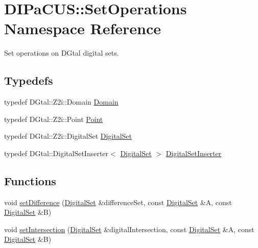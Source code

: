\hypertarget{namespaceDIPaCUS_1_1SetOperations}{}\section{D\+I\+Pa\+C\+US\+:\+:Set\+Operations Namespace Reference}
\label{namespaceDIPaCUS_1_1SetOperations}


Set operations on D\+Gtal digital sets.  


\subsection*{Typedefs}
\begin{DoxyCompactItemize}
\item 
typedef D\+Gtal\+::\+Z2i\+::\+Domain \hyperlink{namespaceDIPaCUS_1_1SetOperations_adf150e3c3201e8eb8b65d3d03b63df69}{Domain}
\item 
typedef D\+Gtal\+::\+Z2i\+::\+Point \hyperlink{namespaceDIPaCUS_1_1SetOperations_aef7c8778c0d7fe3bb3d34608fdef58cc}{Point}
\item 
typedef D\+Gtal\+::\+Z2i\+::\+Digital\+Set \hyperlink{namespaceDIPaCUS_1_1SetOperations_a66926bf2c0a8f9e0192373c76f1b75e1}{Digital\+Set}
\item 
typedef D\+Gtal\+::\+Digital\+Set\+Inserter$<$ \hyperlink{namespaceDIPaCUS_1_1SetOperations_a66926bf2c0a8f9e0192373c76f1b75e1}{Digital\+Set} $>$ \hyperlink{namespaceDIPaCUS_1_1SetOperations_a543100a4da6a06c13ee32ad5886d7031}{Digital\+Set\+Inserter}
\end{DoxyCompactItemize}
\subsection*{Functions}
\begin{DoxyCompactItemize}
\item 
void \hyperlink{namespaceDIPaCUS_1_1SetOperations_a1ac3bb89ed9eb839006dd5f4af4a2353}{set\+Difference} (\hyperlink{namespaceDIPaCUS_1_1SetOperations_a66926bf2c0a8f9e0192373c76f1b75e1}{Digital\+Set} \&difference\+Set, const \hyperlink{namespaceDIPaCUS_1_1SetOperations_a66926bf2c0a8f9e0192373c76f1b75e1}{Digital\+Set} \&A, const \hyperlink{namespaceDIPaCUS_1_1SetOperations_a66926bf2c0a8f9e0192373c76f1b75e1}{Digital\+Set} \&B)
\item 
void \hyperlink{namespaceDIPaCUS_1_1SetOperations_a92fd9567d02bd91848673a235a2b316c}{set\+Intersection} (\hyperlink{namespaceDIPaCUS_1_1SetOperations_a66926bf2c0a8f9e0192373c76f1b75e1}{Digital\+Set} \&digital\+Intersection, const \hyperlink{namespaceDIPaCUS_1_1SetOperations_a66926bf2c0a8f9e0192373c76f1b75e1}{Digital\+Set} \&A, const \hyperlink{namespaceDIPaCUS_1_1SetOperations_a66926bf2c0a8f9e0192373c76f1b75e1}{Digital\+Set} \&B)
\end{DoxyCompactItemize}


